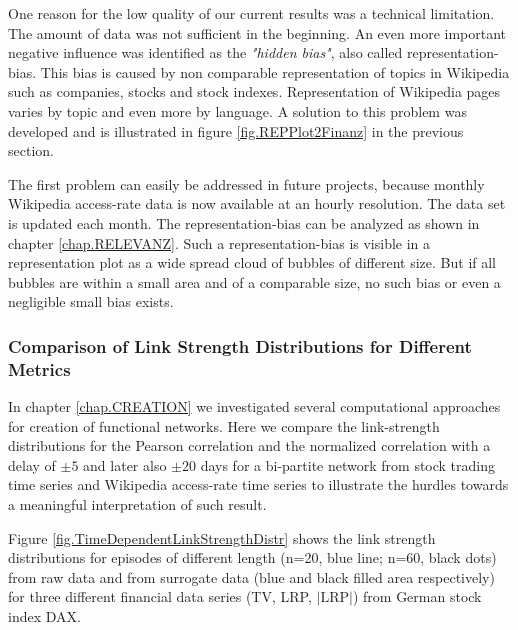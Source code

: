 \documentclass[a4paper,10pt]{scrbook}
\begin{document}
One reason for the low quality of our current results was a technical limitation. The amount of data was not sufficient in the beginning. An even more important negative influence was identified as the \textit{"hidden bias"}, also called representation-bias. This bias is caused by non comparable representation of topics in Wikipedia such as companies, stocks and stock indexes. Representation of Wikipedia pages varies by topic and even more by language. A solution to this problem was developed and is illustrated in figure \ref{fig.REPPlot2Finanz} in the previous section. 

The first problem can easily be addressed in future projects, because monthly Wikipedia access-rate data is now available at an hourly resolution. The data set is updated each month. The representation-bias can be analyzed as shown in chapter \ref{chap.RELEVANZ}. Such a representation-bias is visible in a representation plot as a wide spread cloud of bubbles of different size. But if all bubbles are within a small area and of a comparable size, no such bias or even a negligible small bias exists. 

\subsubsection{Comparison of Link Strength Distributions for Different Metrics}
In chapter \ref{chap.CREATION} we investigated several computational approaches for creation of functional networks. Here we compare the link-strength distributions for the Pearson correlation and the normalized correlation with a delay of $\pm 5$ and later also $\pm 20$ days for a bi-partite network from stock trading time series and Wikipedia access-rate time series to illustrate the hurdles towards a meaningful interpretation of such result. 

Figure \ref{fig.TimeDependentLinkStrengthDistr} shows the link strength distributions for episodes of different length (n=20, blue line; n=60, black dots) from raw data and from surrogate data (blue and black filled area respectively) for three different financial data series (TV, LRP, $\vert \textrm{LRP} \vert$) from German stock index DAX. 

\end{document}
